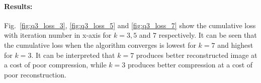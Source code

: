 \paragraph{Results:} Fig.~\ref{fig:q3_loss_3}, \ref{fig:q3_loss_5} and \ref{fig:q3_loss_7} show the cumulative loss with iteration number in x-axis for $k=3,5$ and $7$ respectively. It can be seen that the cumulative loss when the algorithm converges is lowest for $k=7$ and highest for $k=3$. It can be interpreted that $k=7$ produces better reconstructed image at a cost of poor compression, while $k=3$ produces better compression at a cost of poor reconstruction.
\begin{figure}[!h]
	\centering
	\hspace{0.5cm}
	\hspace{0.5cm}

\end{figure}
